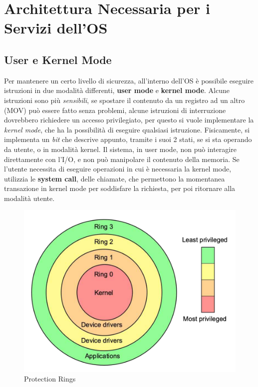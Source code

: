 \documentclass[12pt, letterpaper]{article}
\begin{document}
\section{Architettura Necessaria per i Servizi dell'OS}\subsection{User e Kernel Mode}
Per mantenere un certo livello di sicurezza, all'interno dell'OS è possibile eseguire istruzioni in due 
modalità differenti, \textbf{user mode} e \textbf{kernel mode}. Alcune istruzioni sono più
\textit{sensibili}, se spostare il contenuto da un registro ad un altro (MOV) può essere fatto senza 
problemi, alcune istruzioni di interruzione dovrebbero richiedere un accesso privilegiato, per questo 
si vuole implementare la \textit{kernel mode}, che ha la possibilità di eseguire qualsiasi istruzione.
Fisicamente, si implementa un \textit{bit} che descrive appunto, tramite i suoi 2 stati, se si sta 
operando da utente, o in modalità kernel. Il sistema, in user mode, non può interagire direttamente 
con l'I/O, e non può manipolare il contenuto della memoria. Se l'utente necessita di eseguire operazioni 
in cui è necessaria la kernel mode, utilizzia le \textbf{system call}, delle chiamate, che permettono 
la momentanea transazione in kernel mode per soddisfare la richiesta, per poi ritornare alla modalità 
utente.
\begin{figure}
    \includegraphics[width=1\linewidth]{images/protectionRings.png} 
    \caption{Protection Rings}
    \label{fig:wrapfig}
    \end{figure}
\end{document}
